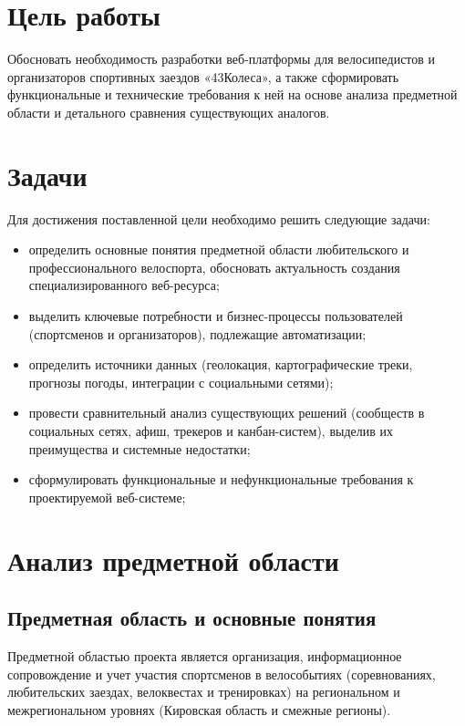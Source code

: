 \documentclass[oneside,a4paper,14pt]{extarticle}
\begin{document}
\setcounter{page}{2}

\section{Цель работы}

Обосновать необходимость разработки веб-платформы для велосипедистов и организаторов спортивных заездов «43Колеса», а также сформировать функциональные и технические требования к ней на основе анализа предметной области и детального сравнения существующих аналогов.

\section{Задачи}

Для достижения поставленной цели необходимо решить следующие задачи:
\begin{itemize}
	\item определить основные понятия предметной области любительского и профессионального велоспорта, обосновать актуальность создания специализированного веб-ресурса;
	\item выделить ключевые потребности и бизнес-процессы пользователей (спортсменов и организаторов), подлежащие автоматизации;
	\item определить источники данных (геолокация, картографические треки, прогнозы погоды, интеграции с социальными сетями);
	\item провести сравнительный анализ существующих решений (сообществ в социальных сетях, афиш, трекеров и канбан-систем), выделив их преимущества и системные недостатки;
	\item сформулировать функциональные и нефункциональные требования к проектируемой веб-системе;
\end{itemize}

\newpage
\section{Анализ предметной области}
\subsection{Предметная область и основные понятия}

Предметной областью проекта является организация, информационное сопровождение и учет участия спортсменов в велособытиях (соревнованиях, любительских заездах, велоквестах и тренировках) на региональном и межрегиональном уровнях (Кировская область и смежные регионы).
\end{document}
